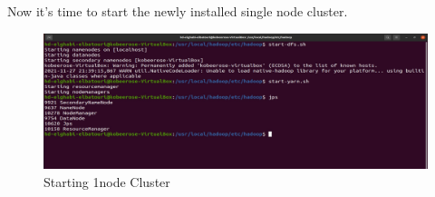 \begin{spacing}{1.2}
\par Now it's time to start the newly installed single node cluster. 
\\
\begin{figure}[!htb] 
\begin{center} 
\includegraphics[width=1\linewidth]{Big_Data/Hadoop/Apache Hadoop Installation/Starting 1node Cluster} 
\end{center} 
\caption{Starting 1node Cluster} 
\end{figure} 
\FloatBarrier


\end{spacing}
